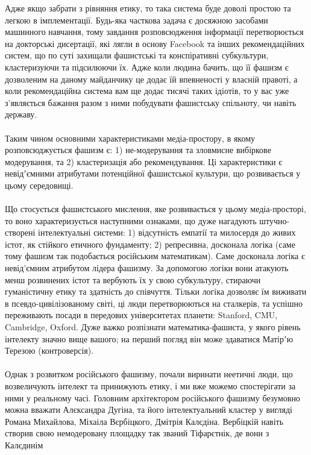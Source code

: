 Адже якщо забрати з рівняння етику, то така система буде доволі простою та легкою
в імплементації. Будь-яка часткова задача є досяжною засобами машинного навчання,
тому завдання розповсюдження інформації перетворюється на докторські дисертації,
які лягли в основу Facebook та інших рекомендаційних систем, що по суті захищали
фашистські та конспіративні субкультури, кластеризуючи та підсилюючи їх. Адже
коли людина бачить, що її фашизм є дозволеним на даному майданчику це додає їй
впевненості у власній правоті, а коли рекомендаційна система вам ще додає тисячі
таких ідіотів, то у вас уже з'являється бажання разом з ними побудувати
фашистську спільноту, чи навіть державу.
\\
\\
Таким чином основними характеристиками медіа-простору, в якому розповсюджується
фашизм є: 1) не-модерування та зловмисне вибіркове модерування, та 2) кластеризація
або рекомендування. Ці характеристики є невідʼємними атрибутами потенційної
фашистської культури, що розвивається у цьому середовищі.
\\
\\
Що стосується фашистського мислення, яке розвивається у цьому медіа-просторі,
то воно характеризується наступними ознаками, що дуже нагадують штучно-створені
інтелектуальні системи: 1) відсутність емпатії та милосердя до живих істот, як
стійкого етичного фундаменту; 2) репресивна, досконала логіка (саме тому фашизм
так подобається російським математикам). Саме досконала логіка є невід'ємним
атрибутом лідера фашизму. За допомогою логіки вони атакують менш розвинених
істот та вербують їх у свою субкультуру, стираючи гуманістичну етику та
здатність до співчуття. Тільки логіка дозволяє їм виживати в псевдо-цивілізованому
світі, ці люди перетворюються на сталкерів, та успішно переживають посади в передових
університетах планети: Stanford, CMU, Cambridge, Oxford. Дуже важко розпізнати
математика-фашиста, у якого рівень інтелекту значно вище вашого; на перший
погляд він може здаватися Матірʼю Терезою (контроверсія).
\\
\\
Однак з розвитком російського фашизму, почали виринати неетичні люди, що
возвеличують інтелект та принижують етику, і ми вже можемо спостерігати
за ними у реальному часі. Головним архітектором російського фашизму безумовно
можна вважати Алєксандра Дугіна, та його інтелектуальний кластер у вигляді
Романа Михайлова, Міхаіла Вєрбіцкого, Дмітрія Калєдіна. Вербіцкій навіть
створив свою немодеровану площадку так званий Тіфарєтнік, де вони з Калєдинім
